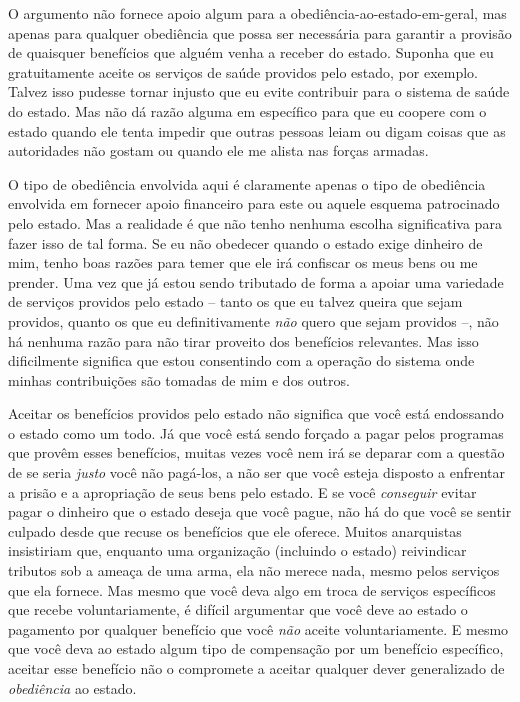 O argumento não fornece apoio algum para a obediência-ao-estado-em-geral, mas apenas para qualquer obediência que possa ser necessária para garantir a provisão de quaisquer benefícios que alguém venha a receber do estado. Suponha que eu gratuitamente aceite os serviços de saúde providos pelo estado, por exemplo. Talvez isso pudesse tornar injusto que eu evite contribuir para o sistema de saúde do estado. Mas não dá razão alguma em específico para que eu coopere com o estado quando ele tenta impedir que outras pessoas leiam ou digam coisas que as autoridades não gostam ou quando ele me alista nas forças armadas.

O tipo de obediência envolvida aqui é claramente apenas o tipo de obediência envolvida em fornecer apoio financeiro para este ou aquele esquema patrocinado pelo estado. Mas a realidade é que não tenho nenhuma escolha significativa para fazer isso de tal forma. Se eu não obedecer quando o estado exige dinheiro de mim, tenho boas razões para temer que ele irá confiscar os meus bens ou me prender. Uma vez que já estou sendo tributado de forma a apoiar uma variedade de serviços providos pelo estado -- tanto os que eu talvez queira que sejam providos, quanto os que eu definitivamente \emph{não} quero que sejam providos --, não há nenhuma razão para não tirar proveito dos benefícios relevantes. Mas isso dificilmente significa que estou consentindo com a operação do sistema onde minhas contribuições são tomadas de mim e dos outros.

Aceitar os benefícios providos pelo estado não significa que você está endossando o estado como um todo. Já que você está sendo forçado a pagar pelos programas que provêm esses benefícios, muitas vezes você nem irá se deparar com a questão de se seria \emph{justo} você não pagá-los, a não ser que você esteja disposto a enfrentar a prisão e a apropriação de seus bens pelo estado. E se você \emph{conseguir} evitar pagar o dinheiro que o estado deseja que você pague, não há do que você se sentir culpado desde que recuse os benefícios que ele oferece. Muitos anarquistas insistiriam que, enquanto uma organização (incluindo o estado) reivindicar tributos sob a ameaça de uma arma, ela não merece nada, mesmo pelos serviços que ela fornece. Mas mesmo que você deva algo em troca de serviços específicos que recebe voluntariamente, é difícil argumentar que você deve ao estado o pagamento por qualquer benefício que você \emph{não} aceite voluntariamente. E mesmo que você deva ao estado algum tipo de compensação por um benefício específico, aceitar esse benefício não o compromete a aceitar qualquer dever generalizado de \emph{obediência} ao estado.

